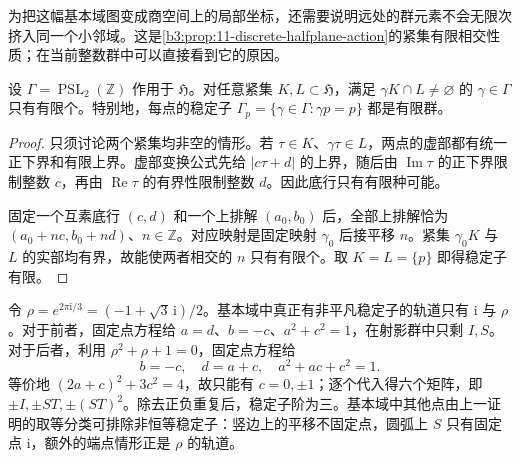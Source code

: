 为把这幅基本域图变成商空间上的局部坐标，还需要说明远处的群元素不会无限次挤入同一个小邻域。这是\cref{b3:prop:11-discrete-halfplane-action}的紧集有限相交性质；在当前整数群中可以直接看到它的原因。

\begin{proposition}[模群作用的紧集有限性]\label{b3:prop:23-proper-action}
设 \(\Gamma=\operatorname{PSL}_2(\mathbb Z)\) 作用于 \(\mathfrak H\)。对任意紧集 \(K,L\subset\mathfrak H\)，满足 \(\gamma K\cap L\ne\varnothing\) 的 \(\gamma\in\Gamma\) 只有有限个。特别地，每点的稳定子 \(\Gamma_p=\{\gamma\in\Gamma:\gamma p=p\}\) 都是有限群。
\end{proposition}
\begin{proof}
只须讨论两个紧集均非空的情形。若 \(\tau\in K\)、\(\gamma\tau\in L\)，两点的虚部都有统一正下界和有限上界。虚部变换公式先给 \(|c\tau+d|\) 的上界，随后由 \(\operatorname{Im}\tau\) 的正下界限制整数 \(c\)，再由 \(\operatorname{Re}\tau\) 的有界性限制整数 \(d\)。因此底行只有有限种可能。

固定一个互素底行 \((c,d)\) 和一个上排解 \((a_0,b_0)\) 后，全部上排解恰为 \((a_0+nc,b_0+nd)\)、\(n\in\mathbb Z\)。对应映射是固定映射 \(\gamma_0\) 后接平移 \(n\)。紧集 \(\gamma_0K\) 与 \(L\) 的实部均有界，故能使两者相交的 \(n\) 只有有限个。取 \(K=L=\{p\}\) 即得稳定子有限。
\end{proof}

令 \(\rho=e^{2\pi\mathrm{i}/3}=(-1+\sqrt3\,\mathrm{i})/2\)。基本域中真正有非平凡稳定子的轨道只有 \(\mathrm{i}\) 与 \(\rho\)。对于前者，固定点方程给 \(a=d\)、\(b=-c\)、\(a^2+c^2=1\)，在射影群中只剩 \(I,S\)。对于后者，利用 \(\rho^2+\rho+1=0\)，固定点方程给
\[
 b=-c,\quad d=a+c,\quad a^2+ac+c^2=1.
\]
等价地 \((2a+c)^2+3c^2=4\)，故只能有 \(c=0,\pm1\)；逐个代入得六个矩阵，即 \(\pm I,\pm ST,\pm(ST)^2\)。除去正负重复后，稳定子阶为三。基本域中其他点由上一证明的取等分类可排除非恒等稳定子：竖边上的平移不固定点，圆弧上 \(S\) 只有固定点 \(\mathrm{i}\)，额外的端点情形正是 \(\rho\) 的轨道。

